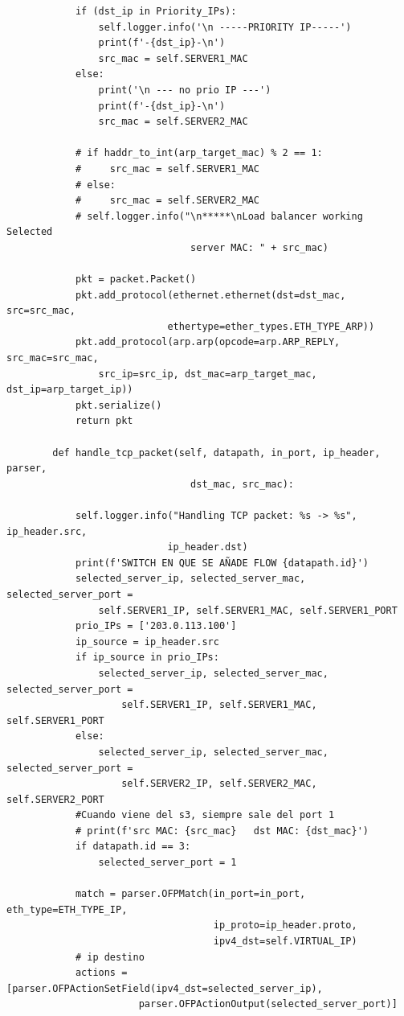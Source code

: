 \documentclass[a4paper,12pt]{article}
\begin{document}
\begin{verbatim}
            if (dst_ip in Priority_IPs):
                self.logger.info('\n -----PRIORITY IP-----')
                print(f'-{dst_ip}-\n')
                src_mac = self.SERVER1_MAC
            else:
                print('\n --- no prio IP ---')
                print(f'-{dst_ip}-\n')
                src_mac = self.SERVER2_MAC
    
            # if haddr_to_int(arp_target_mac) % 2 == 1:
            #     src_mac = self.SERVER1_MAC
            # else:
            #     src_mac = self.SERVER2_MAC
            # self.logger.info("\n*****\nLoad balancer working Selected
                                server MAC: " + src_mac)
    
            pkt = packet.Packet()
            pkt.add_protocol(ethernet.ethernet(dst=dst_mac, src=src_mac,
                            ethertype=ether_types.ETH_TYPE_ARP))
            pkt.add_protocol(arp.arp(opcode=arp.ARP_REPLY, src_mac=src_mac,
                src_ip=src_ip, dst_mac=arp_target_mac, dst_ip=arp_target_ip))
            pkt.serialize()
            return pkt
    
        def handle_tcp_packet(self, datapath, in_port, ip_header, parser, 
                                dst_mac, src_mac):
    
            self.logger.info("Handling TCP packet: %s -> %s", ip_header.src,
                            ip_header.dst)
            print(f'SWITCH EN QUE SE AÑADE FLOW {datapath.id}')
            selected_server_ip, selected_server_mac, selected_server_port = 
                self.SERVER1_IP, self.SERVER1_MAC, self.SERVER1_PORT
            prio_IPs = ['203.0.113.100']
            ip_source = ip_header.src
            if ip_source in prio_IPs:
                selected_server_ip, selected_server_mac, selected_server_port = 
                    self.SERVER1_IP, self.SERVER1_MAC, self.SERVER1_PORT
            else:
                selected_server_ip, selected_server_mac, selected_server_port = 
                    self.SERVER2_IP, self.SERVER2_MAC, self.SERVER2_PORT
            #Cuando viene del s3, siempre sale del port 1
            # print(f'src MAC: {src_mac}   dst MAC: {dst_mac}')
            if datapath.id == 3:
                selected_server_port = 1
            
            match = parser.OFPMatch(in_port=in_port, eth_type=ETH_TYPE_IP, 
                                    ip_proto=ip_header.proto,
                                    ipv4_dst=self.VIRTUAL_IP)
            # ip destino
            actions = [parser.OFPActionSetField(ipv4_dst=selected_server_ip),
                       parser.OFPActionOutput(selected_server_port)]
    

\end{verbatim}
\end{document}
